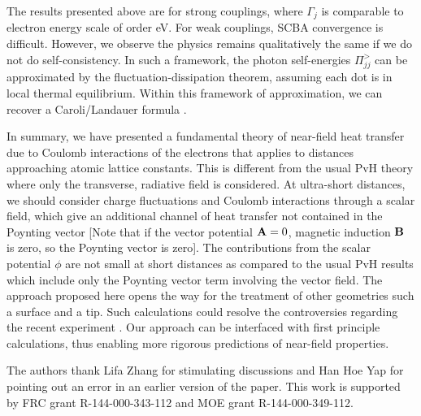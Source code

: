\documentclass[doublecol]{epl2}
\begin{document}
The results presented above are for strong couplings, where $\Gamma_j$ is comparable to electron energy scale of
order eV.  For weak couplings, SCBA convergence is difficult.   However, we observe the physics remains
qualitatively the same if we do not do  self-consistency.  In such a framework, the photon self-energies
$\Pi_{jj}^>$ can be approximated by the fluctuation-dissipation theorem, assuming each dot is in local thermal
equilibrium.  Within this framework of approximation, we can recover a Caroli/Landauer formula \cite{peng-long-PRB}.


In summary, we have presented a fundamental theory of near-field
heat transfer due to Coulomb interactions of the electrons that applies to distances approaching atomic lattice constants.  
This is different from the usual PvH theory where only  the transverse, radiative field is considered. 
At ultra-short distances, we should consider charge fluctuations and Coulomb interactions through a 
scalar field, which give an additional channel of heat transfer not contained in the Poynting vector [Note that if
the vector potential ${\bf A}=0$, magnetic induction ${\bf B}$ is zero, so the Poynting vector is zero]. 
The contributions from the scalar potential $\phi$ are not small at short distances  \cite{Yu2016} as compared to the usual PvH 
results which include only the Poynting vector term involving the vector field. 
The approach proposed here opens the way for the treatment of other geometries such a surface and a tip. 
Such calculations could resolve the controversies regarding the recent experiment \cite{Kloppstech2015}. 
Our approach can be interfaced with first principle calculations, thus enabling more rigorous predictions of near-field properties.

The authors thank Lifa Zhang for stimulating discussions and Han Hoe Yap for pointing out an error in an earlier version of the paper. This work is supported by FRC grant R-144-000-343-112 and MOE grant R-144-000-349-112. 



\end{document}

